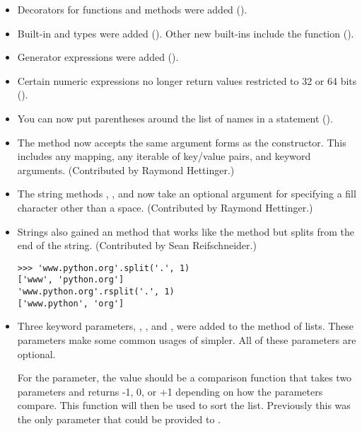 \documentclass{howto}
\begin{document}
\begin{itemize}

\item Decorators for functions and methods were added ().

\item Built-in  and  types were 
added ().  Other new built-ins include the  function ().

\item Generator expressions were added ().

\item Certain numeric expressions no longer return values restricted to 32 or 64 bits ().

\item You can now put parentheses around the list of names in a
 statement ().

\item The  method now accepts the same
argument forms as the  constructor.  This includes any
mapping, any iterable of key/value pairs, and keyword arguments.
(Contributed by Raymond Hettinger.)

\item The string methods , , and
 now take an optional argument for specifying a
fill character other than a space.
(Contributed by Raymond Hettinger.)

\item Strings also gained an  method that
works like the  method but splits from the end of
the string.  
(Contributed by Sean Reifschneider.)

\begin{verbatim}
>>> 'www.python.org'.split('.', 1)
['www', 'python.org']
'www.python.org'.rsplit('.', 1)
['www.python', 'org']        
\end{verbatim}      

\item Three keyword parameters, , , and
, were added to the  method of lists.
These parameters make some common usages of  simpler.
All of these parameters are optional.

For the  parameter, the value should be a comparison function
that takes two parameters and returns -1, 0, or +1 depending on how
the parameters compare.  This function will then be used to sort the
list.  Previously this was the only parameter that could be provided
to .


\end{itemize}
\end{document}
